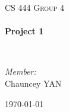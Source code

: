 \begin{titlepage}
\begin{center}


\vspace{5in}

\textsc{\LARGE CS 444 Group 4}\\[0.5cm]

\HRule \\[0.4cm]
{ \huge \bfseries Project 1 \\[0.4cm] }

\HRule \\[1.5cm]

\begin{center} \large
\emph{Member:}\\
Chauncey \textsc{YAN}

\end{center}


\vfill

{\large \today}

\end{center}
\end{titlepage}

